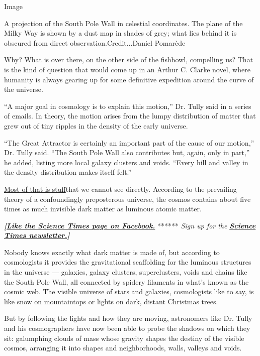 Image

A projection of the South Pole Wall in celestial coordinates. The plane
of the Milky Way is shown by a dust map in shades of grey; what lies
behind it is obscured from direct observation.Credit...Daniel Pomarède

Why? What is over there, on the other side of the fishbowl, compelling
us? That is the kind of question that would come up in an Arthur C.
Clarke novel, where humanity is always gearing up for some definitive
expedition around the curve of the universe.

``A major goal in cosmology is to explain this motion,'' Dr. Tully said
in a series of emails. In theory, the motion arises from the lumpy
distribution of matter that grew out of tiny ripples in the density of
the early universe.

``The Great Attractor is certainly an important part of the cause of our
motion,'' Dr. Tully said. ``The South Pole Wall also contributes but,
again, only in part,'' he added, listing more local galaxy clusters and
voids. ``Every hill and valley in the density distribution makes itself
felt.''

\href{https://www.youtube.com/watch?v=UmW5TAULdAs}{Most of that is
stuff}that we cannot see directly. According to the prevailing theory of
a confoundingly preposterous universe, the cosmos contains about five
times as much invisible dark matter as luminous atomic matter.

\textbf{\emph{{[}}\href{http://on.fb.me/1paTQ1h}{\emph{Like the Science
Times page on Facebook.}}} ****** \emph{\textbar{} Sign up for the}
\textbf{\href{http://nyti.ms/1MbHaRU}{\emph{Science Times
newsletter.}}\emph{{]}}}

Nobody knows exactly what dark matter is made of, but according to
cosmologists it provides the gravitational scaffolding for the luminous
structures in the universe --- galaxies, galaxy clusters, superclusters,
voids and chains like the South Pole Wall, all connected by spidery
filaments in what's known as the cosmic web. The visible universe of
stars and galaxies, cosmologists like to say, is like snow on
mountaintops or lights on dark, distant Christmas trees.

But by following the lights and how they are moving, astronomers like
Dr. Tully and his cosmographers have now been able to probe the shadows
on which they sit: galumphing clouds of mass whose gravity shapes the
destiny of the visible cosmos, arranging it into shapes and
neighborhoods, walls, valleys and voids.

